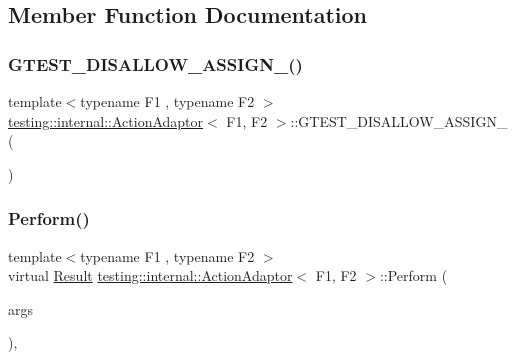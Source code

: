 \subsection{Member Function Documentation}
\mbox{\label{classtesting_1_1internal_1_1_action_adaptor_ad46465f82ccd055324fa267308c2753e}} 
\subsubsection{\texorpdfstring{GTEST\_DISALLOW\_ASSIGN\_()}{GTEST\_DISALLOW\_ASSIGN\_()}}
{\footnotesize\ttfamily template$<$typename F1 , typename F2 $>$ \\
\mbox{\hyperlink{classtesting_1_1internal_1_1_action_adaptor}{testing\+::internal\+::\+Action\+Adaptor}}$<$ F1, F2 $>$\+::G\+T\+E\+S\+T\+\_\+\+D\+I\+S\+A\+L\+L\+O\+W\+\_\+\+A\+S\+S\+I\+G\+N\+\_\+ (\begin{DoxyParamCaption}\item[{\mbox{\hyperlink{classtesting_1_1internal_1_1_action_adaptor}{Action\+Adaptor}}$<$ F1, F2 $>$}]{ }\end{DoxyParamCaption})\hspace{0.3cm}{\ttfamily [private]}}

\mbox{\label{classtesting_1_1internal_1_1_action_adaptor_a8d8a47a31f068cf6e0c95b91605d5540}} 
\subsubsection{\texorpdfstring{Perform()}{Perform()}}
{\footnotesize\ttfamily template$<$typename F1 , typename F2 $>$ \\
virtual \mbox{\hyperlink{classtesting_1_1internal_1_1_action_adaptor_afa8f7872b6db3d8f1545fd98b45b0b95}{Result}} \mbox{\hyperlink{classtesting_1_1internal_1_1_action_adaptor}{testing\+::internal\+::\+Action\+Adaptor}}$<$ F1, F2 $>$\+::Perform (\begin{DoxyParamCaption}\item[{const \mbox{\hyperlink{classtesting_1_1internal_1_1_action_adaptor_a4f78fb73f97b72fea8a93b78a8ab5704}{Argument\+Tuple}} \&}]{args }\end{DoxyParamCaption})\hspace{0.3cm}{\ttfamily [inline]}, {\ttfamily [virtual]}}



